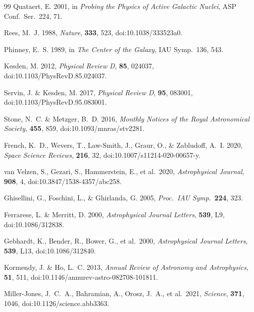 \documentclass[11pt]{article}
\begin{document}
\begin{thebibliography}{99}
Quataert, E. 2001,
in \emph{Probing the Physics of Active Galactic Nuclei}, ASP Conf.\ Ser.\ 224, 71.

Rees, M.~J. 1988,
\emph{Nature}, \textbf{333}, 523,
doi:10.1038/333523a0.

Phinney, E.~S. 1989,
in \emph{The Center of the Galaxy}, IAU Symp.\ 136, 543.

Kesden, M. 2012,
\emph{Physical Review D}, \textbf{85}, 024037,
doi:10.1103/PhysRevD.85.024037.

Servin, J. \& Kesden, M. 2017,
\emph{Physical Review D}, \textbf{95}, 083001,
doi:10.1103/PhysRevD.95.083001.

Stone, N.~C. \& Metzger, B.~D. 2016,
\emph{Monthly Notices of the Royal Astronomical Society}, \textbf{455}, 859,
doi:10.1093/mnras/stv2281.

French, K.~D., Wevers, T., Law-Smith, J., Graur, O., \& Zabludoff, A.~I. 2020,
\emph{Space Science Reviews}, \textbf{216}, 32,
doi:10.1007/s11214-020-00657-y.

van Velzen, S., Gezari, S., Hammerstein, E., et al.\ 2020,
\emph{Astrophysical Journal}, \textbf{908}, 4,
doi:10.3847/1538-4357/abc258.

Ghisellini, G., Foschini, L., \& Ghirlanda, G. 2005,
\emph{Proc.\ IAU Symp.}\ \textbf{224}, 323.

Ferrarese, L. \& Merritt, D. 2000,
\emph{Astrophysical Journal Letters}, \textbf{539}, L9,
doi:10.1086/312838.

Gebhardt, K., Bender, R., Bower, G., et al.\ 2000,
\emph{Astrophysical Journal Letters}, \textbf{539}, L13,
doi:10.1086/312840.

Kormendy, J. \& Ho, L.~C. 2013,
\emph{Annual Review of Astronomy and Astrophysics}, \textbf{51}, 511,
doi:10.1146/annurev-astro-082708-101811.

Miller-Jones, J.~C.~A., Bahramian, A., Orosz, J.~A., et al.\ 2021,
\emph{Science}, \textbf{371}, 1046,
doi:10.1126/science.abb3363.


\end{thebibliography}
\end{document}
